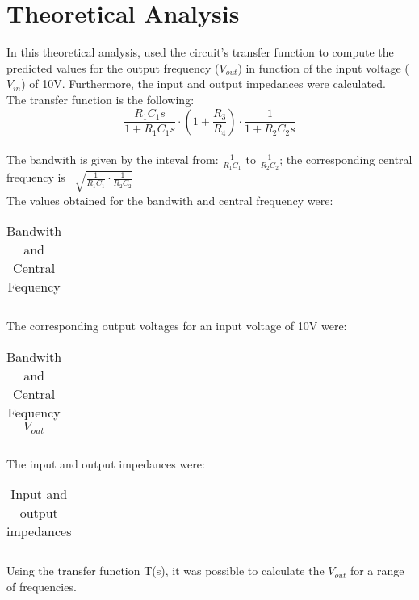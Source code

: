 \section{Theoretical Analysis}
\label{sec:analysis}

In this theoretical analysis, used the circuit's transfer function to compute the predicted values for the output frequency ($V_{out}$) in function of the input voltage ($V_{in}$) of 10V. Furthermore, the input and output impedances were calculated.\\
The transfer function is the following: \[\frac{R_1C_1s}{1+R_1C_1s} \cdot (1+\frac{R_3}{R_4}) \cdot \frac{1}{1+R_2C_2s}\] \\

The bandwith is given by the inteval from: $\frac{1}{R_1C_1}$ to $\frac{1}{R_2C_2}$; the corresponding central frequency is \ $\sqrt{{\frac{1}{R_1C_1} \cdot \frac{1}{R_2C_2}}}$\\

The values obtained for the bandwith and central frequency were:

\FloatBarrier
\begin{table}[h]
  \centering
  \begin{tabular}{|c|c|}
    \hline    
    
    \hline
  \end{tabular}
  \caption{Bandwith and Central Fequency}
  \label{tab:Octave_cent}
\end{table}
\FloatBarrier

The corresponding output voltages for an input voltage of 10V were:
\FloatBarrier
\begin{table}[h]
  \centering
  \begin{tabular}{|c|c|}
    \hline    
    
    \hline
  \end{tabular}
  \caption{Bandwith and Central Fequency $V_{out}$}
  \label{tab:Octave_cent}
\end{table}

\FloatBarrier

The input and output impedances were:
\FloatBarrier
\begin{table}[h]
  \centering
  \begin{tabular}{|c|c|c|}
    \hline    
    
    \hline
  \end{tabular}
  \caption{Input and output impedances}
  \label{tab:Octave_cent}
\end{table}
\FloatBarrier

Using the transfer function T(s), it was possible to calculate the $V_{out}$ for a range of frequencies.

